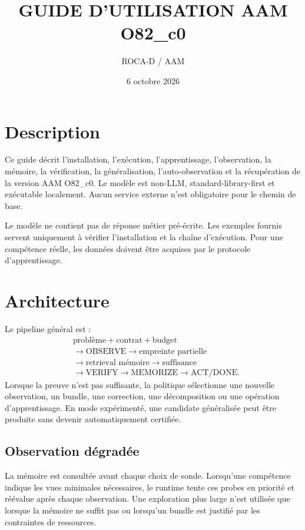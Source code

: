 \documentclass[11pt,a4paper]{report}
\title{GUIDE D'UTILISATION AAM O82\_c0}
\author{ROCA-D / AAM}
\date{6 octobre 2026}
\begin{document}
\setlength{\emergencystretch}{2em}
\maketitle
\tableofcontents

\chapter{Description}
Ce guide décrit l'installation, l'exécution, l'apprentissage, l'observation, la mémoire, la vérification, la généralisation, l'auto-observation et la récupération de la version AAM O82\_c0. Le modèle est non-LLM, standard-library-first et exécutable localement. Aucun service externe n'est obligatoire pour le chemin de base.

Le modèle ne contient pas de réponse métier pré-écrite. Les exemples fournis servent uniquement à vérifier l'installation et la chaîne d'exécution. Pour une compétence réelle, les données doivent être acquises par le protocole d'apprentissage.

\chapter{Architecture}
Le pipeline général est :
\begin{align*}
&\text{problème}+\text{contrat}+\text{budget}\\
&\rightarrow\text{OBSERVE}\rightarrow\text{empreinte partielle}\\
&\rightarrow\text{retrieval mémoire}\rightarrow\text{suffisance}\\
&\rightarrow\text{VERIFY}\rightarrow\text{MEMORIZE}\rightarrow\text{ACT/DONE}.
\end{align*}
Lorsque la preuve n'est pas suffisante, la politique sélectionne une nouvelle observation, un bundle, une correction, une décomposition ou une opération d'apprentissage. En mode expérimenté, une candidate généralisée peut être produite sans devenir automatiquement certifiée.

\section{Observation dégradée}
La mémoire est consultée avant chaque choix de sonde. Lorsqu'une compétence indique les vues minimales nécessaires, le runtime tente ces probes en priorité et réévalue après chaque observation. Une exploration plus large n'est utilisée que lorsque la mémoire ne suffit pas ou lorsqu'un bundle est justifié par les contraintes de ressources.
\end{document}
